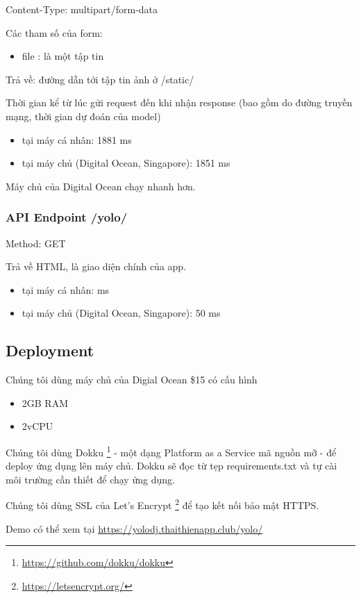 Content-Type: multipart/form-data 

Các tham số của form: 
\begin{itemize}
\item file : là một tập tin 
\end{itemize}

Trả về: đường dẫn tới tập tin ảnh ở /static/

Thời gian kể từ lúc gửi request đến khi nhận response (bao gồm do đường truyền mạng, thời gian dự đoán của model)

\begin{itemize}
\item tại máy cá nhân: 1881 ms 
\item tại máy chủ (Digital Ocean, Singapore): 1851 ms
\end{itemize}

Máy chủ của Digital Ocean chạy nhanh hơn. 

\subsubsection{API Endpoint /yolo/}
Method: GET

Trả về HTML, là giao diện chính của app. 

\begin{itemize}
\item tại máy cá nhân:  ms 
\item tại máy chủ (Digital Ocean, Singapore): 50 ms
\end{itemize}

\subsection{Deployment}
Chúng tôi dùng máy chủ của Digial Ocean \$15 có cấu hình 

\begin{itemize}
\item 2GB RAM
\item 2vCPU 
\end{itemize}

Chúng tôi dùng Dokku \footnote{\url{https://github.com/dokku/dokku}} - một dạng Platform as a Service mã nguồn mỡ - để deploy ứng dụng lên máy chủ. Dokku sẽ đọc từ tẹp requirements.txt và tự cài môi trường cần thiết để chạy ứng dụng. 

Chúng tôi dùng SSL của Let's Encrypt \footnote{\url{https://letsencrypt.org/}} để tạo kết nối bảo mật HTTPS.

Demo có thể xem tại \url{https://yolodj.thaithienapp.club/yolo/}


